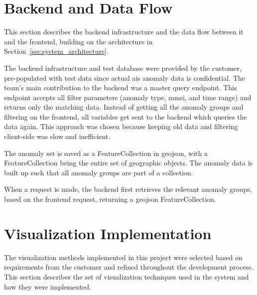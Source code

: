 \section{Backend and Data Flow}
\label{sec:backend_and_data_flow_method}
This section describes the backend infrastructure and the data flow between it and the frontend, building on the architecture in Section~\ref{sec:system_architecture}.

The backend infrastructure and test database were provided by the customer, pre-populated with test data since actual \acrshort{ais} anomaly data is confidential. The team's main contribution to the backend was a master query endpoint. This endpoint accepts all filter parameters (anomaly type, \acrshort{mmsi}, and time range) and returns only the matching data. Instead of getting all the anomaly groups and filtering on the frontend, all variables get sent to the backend which queries the data again. This approach was chosen because keeping old data and filtering client-side was slow and inefficient.

The anomaly set is saved as a FeatureCollection in \acrshort{geojson}, with a FeatureCollection being the entire set of geographic objects. The anomaly data is built up such that all anomaly groups are part of a collection.

When a request is made, the backend first retrieves the relevant anomaly groups, based on the frontend request, returning a \acrshort{geojson} FeatureCollection.

\section{Visualization Implementation}
\label{sec:visualization_implementation}

The visualization methods implemented in this project were selected based on requirements from the customer and refined throughout the development process. This section describes the set of visualization techniques used in the system and how they were implemented.

